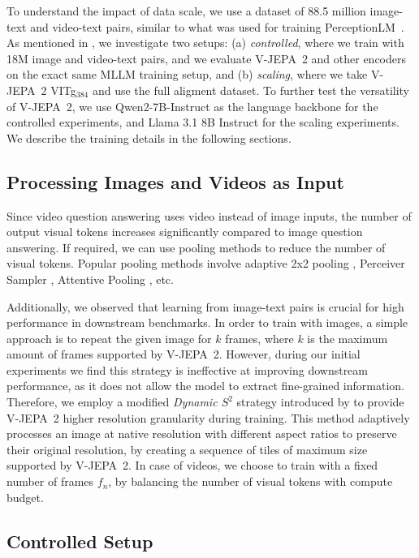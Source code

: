 \documentclass[]{fairmeta}
\newcommand{\model}{V-JEPA~2\xspace}
\begin{document}
To understand the impact of data scale, we use a dataset of 88.5 million image-text and video-text pairs, similar to what was used for training PerceptionLM~\citep{cho2025perceptionlm}. As mentioned in , we investigate two setups: (a) \textit{controlled}, where we train with 18M image and video-text pairs, and we evaluate \model and other encoders on the exact same MLLM training setup, and (b) \textit{scaling}, where we take \model VITg$_{384}$ and use the full aligment dataset.
To further test the versatility of \model, we use Qwen2-7B-Instruct \citep{yang2024qwen2technicalreport} as the language backbone for the controlled experiments, and Llama 3.1 8B Instruct \citep{grattafiori2024llama} for the scaling experiments. We describe the training details in the following sections.

\subsection{Processing Images and Videos as Input}
Since video question answering uses video instead of image inputs, the number of output visual tokens increases significantly compared to image question answering. If required, we can use pooling methods to reduce the number of visual tokens. Popular pooling methods involve adaptive 2x2 pooling \citep{cho2025perceptionlm}, Perceiver Sampler \citep{jaegle2021perceiver}, Attentive Pooling \citep{bardes2024revisiting}, etc. 

Additionally, we observed that learning from image-text pairs is crucial for high performance in downstream benchmarks. In order to train with images, a simple approach is to repeat the given image for $k$ frames, where $k$ is the maximum amount of frames supported by \model. However, during our initial experiments we find this strategy is ineffective at improving downstream performance, as it does not allow the model to extract fine-grained information.
Therefore, we employ a modified \textit{Dynamic $S^2$} strategy introduced by \citet{liu2024nvila} to provide \model higher resolution granularity during training. This method adaptively processes an image at native resolution with different aspect ratios to preserve their  original resolution, by creating a sequence of tiles of maximum size supported by \model.
In case of videos, we choose to train with a fixed number of frames $f_n$, by balancing the number of visual tokens with compute budget.

\subsection{Controlled Setup}
\end{document}
